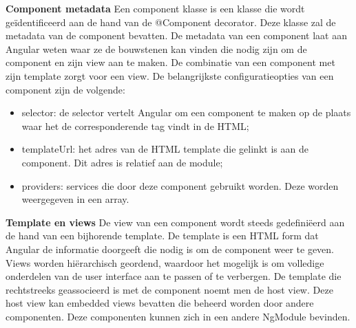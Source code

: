 \textbf{Component metadata} \hspace{1cm} Een component klasse is een klasse die wordt geïdentificeerd aan de hand van de @Component decorator. Deze klasse zal de metadata van de component bevatten. De metadata van een component laat aan Angular weten waar ze de bouwstenen kan vinden die nodig zijn om de component en zijn view aan te maken. De combinatie van een component met zijn template zorgt voor een view. 
De belangrijkste configuratieopties van een component zijn de volgende:
\begin{itemize}
	\item selector: de selector vertelt Angular om een component te maken op de plaats waar het de corresponderende tag vindt in de HTML; 
	\item templateUrl: het adres van de HTML template die gelinkt is aan de component. Dit adres is relatief aan de module; 
	\item providers: services die door deze component gebruikt worden. Deze worden weergegeven in een array. 
\end{itemize}

\textbf{Template en views} \hspace{1cm} De view van een component wordt steeds gedefiniëerd aan de hand van een bijhorende template. De template is een HTML form dat Angular de informatie doorgeeft die nodig is om de component weer te geven. Views worden hiërarchisch geordend, waardoor het mogelijk is om volledige onderdelen van de user interface aan te passen of te verbergen. De template die rechtstreeks geassocieerd is met de component noemt men de host view. Deze host view kan embedded views bevatten die beheerd worden door andere componenten. Deze componenten kunnen zich in een andere NgModule bevinden. 


